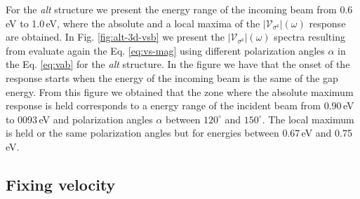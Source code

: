 \documentclass[prb,11pt,tightenlines,twocolumn,aps]{revtex4-1}
\begin{document}
For the \emph{alt} structure we present the energy range of the incoming beam from 0.6\,eV to 1.0\,eV, where the absolute and a local maxima of the
$|\mathcal{V}_{\sigma^{\mathrm{z}}}|(\omega)$ response are obtained.
% 
In Fig. \ref{fig:alt-3d-vsb} we present the
$|\mathcal{V}_{\sigma^{\mathrm{z}}}|(\omega)$ spectra resulting from evaluate
again the Eq. \eqref{eq:vs-mag} using different polarization angles $\alpha$ in
the Eq. \eqref{eq:vab} for the \emph{alt} structure. In the figure we have that
the onset of the response starts when the energy of the incoming beam is the
same of the gap energy.
% 
From this figure we obtained that the zone where the absolute maximum response
is held corresponds to a energy range of the incident beam from 0.90\,eV to
0093\,eV and polarization angles $\alpha$ between $120^{\circ}$ and
$150^{\circ}$. The local maximum is held or the same polarization angles but for
energies between 0.67\,eV and 0.75\,eV.



\subsection{Fixing velocity} %
\label{sec:res-fixvel}


\end{document}
